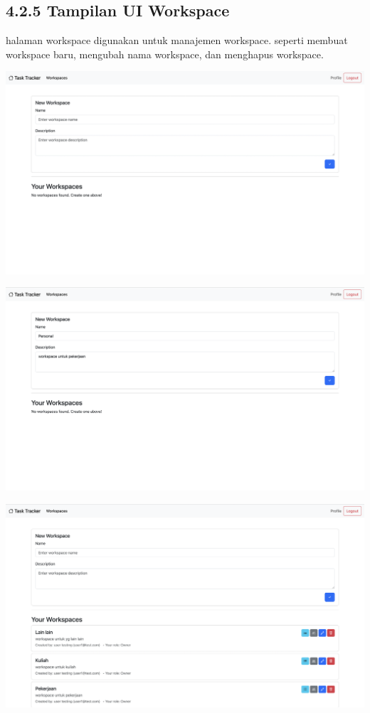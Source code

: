 \subsection*{4.2.5 Tampilan UI Workspace}
halaman workspace digunakan untuk manajemen workspace. 
seperti membuat workspace baru, mengubah nama workspace, dan menghapus workspace.
\begin{center}
  \includegraphics[width=1\textwidth]{assets/ui/workspace_empty.png}
\end{center}
\begin{center}
  \includegraphics[width=1\textwidth]{assets/ui/workspace_create_filled.png}
\end{center}
\begin{center}
  \includegraphics[width=1\textwidth]{assets/ui/list_workspace.png}
\end{center}
